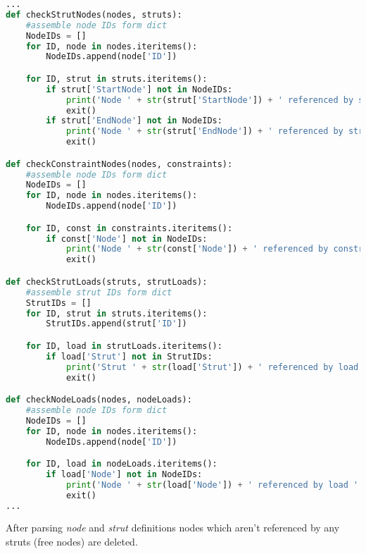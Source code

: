 \begin{inconsolata}
\begin{minipage}{\linewidth}
\begin{lstlisting}[language=python]
...
def checkStrutNodes(nodes, struts):
    #assemble node IDs form dict
    NodeIDs = []
    for ID, node in nodes.iteritems():
        NodeIDs.append(node['ID'])

    for ID, strut in struts.iteritems():
        if strut['StartNode'] not in NodeIDs:
            print('Node ' + str(strut['StartNode']) + ' referenced by strut ' + str(strut['ID']) + ' but not defined.')
            exit()
        if strut['EndNode'] not in NodeIDs:
            print('Node ' + str(strut['EndNode']) + ' referenced by strut ' + str(strut['ID']) + ' but not defined.')
            exit()

def checkConstraintNodes(nodes, constraints):
    #assemble node IDs form dict
    NodeIDs = []
    for ID, node in nodes.iteritems():
        NodeIDs.append(node['ID'])

    for ID, const in constraints.iteritems():
        if const['Node'] not in NodeIDs:
            print('Node ' + str(const['Node']) + ' referenced by constraint ' + str(ID) + ' but not defined.')
            exit()

def checkStrutLoads(struts, strutLoads):
    #assemble strut IDs form dict
    StrutIDs = []
    for ID, strut in struts.iteritems():
        StrutIDs.append(strut['ID'])

    for ID, load in strutLoads.iteritems():
        if load['Strut'] not in StrutIDs:
            print('Strut ' + str(load['Strut']) + ' referenced by load ' + str(ID) + ' but not defined.')
            exit()

def checkNodeLoads(nodes, nodeLoads):
    #assemble node IDs form dict
    NodeIDs = []
    for ID, node in nodes.iteritems():
        NodeIDs.append(node['ID'])

    for ID, load in nodeLoads.iteritems():
        if load['Node'] not in NodeIDs:
            print('Node ' + str(load['Node']) + ' referenced by load ' + str(ID) + ' but not defined.')
            exit()
...
\end{lstlisting}
\end{minipage}
\end{inconsolata}

After parsing \textit{node} and \textit{strut} definitions nodes which aren't referenced by any struts (free nodes) are deleted. 

